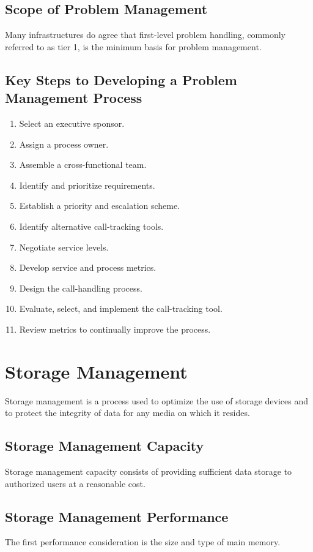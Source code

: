 \documentclass[a4]{article}
\begin{document}
\begin{multicols}{3}
\subsection{Scope of Problem Management}
Many infrastructures do agree that first-level problem handling, commonly referred to as tier 1,
 is the minimum basis for problem management.

\subsection{Key Steps to Developing a Problem Management Process}
\begin{enumerate}
\item Select an executive sponsor.
\item Assign a process owner.
\item Assemble a cross-functional team.
\item Identify and prioritize requirements.
\item Establish a priority and escalation scheme.
\item Identify alternative call-tracking tools.
\item Negotiate service levels.
\item Develop service and process metrics.
\item Design the call-handling process.
\item Evaluate, select, and implement the call-tracking tool.
\item Review metrics to continually improve the process.
\end{enumerate}

\section{Storage Management}
Storage management is a process used to optimize the use of storage devices and to protect the integrity of data 
for any media on which it resides.

\subsection{Storage Management Capacity}
Storage management capacity consists of providing sufficient data storage to authorized users at a reasonable cost.

\subsection{Storage Management Performance}
The first performance consideration is the size and type of main memory.


\end{multicols}
\end{document}
